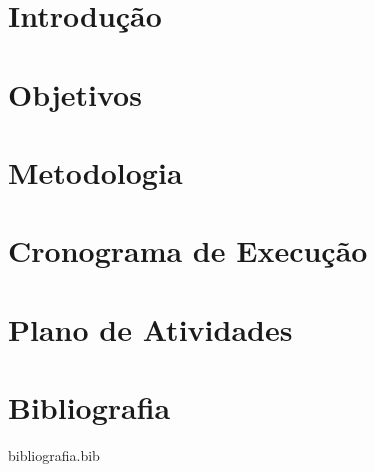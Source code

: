 \documentclass[12pt,a4paper,ruledheader,espacoumemeio,floatnumber=continuous]{abnt}
\begin{document}

	
	
	{\let\clearpage\relax\section{Introdução}}\label{sec:introducao}
    	

	{\let\clearpage\relax\section{Objetivos}}\label{sec:objetivos}
    	
    
	{\let\clearpage\relax\section{Metodologia}}\label{sec:metodologia}
	
	
	{\let\clearpage\relax\section{Cronograma de Execução}}\label{sec:cronograma}
	
	
	{\let\clearpage\relax\section{Plano de Atividades}}\label{sec:atividades}
	
	
 	{\let\clearpage\relax\section{Bibliografia}}\label{sec:bibliografia}
    
	\begin{btSect}{bibliografia.bib}
        	\btPrintCited
	\end{btSect}
\end{document}
